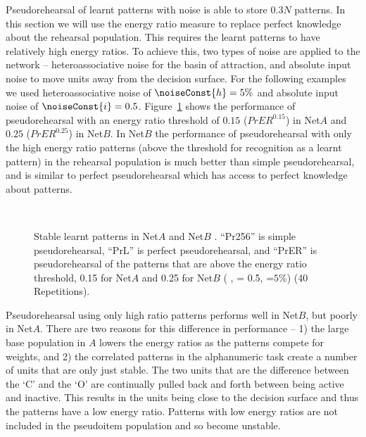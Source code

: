 Pseudorehearsal of learnt patterns with noise is able to store $0.3N$ patterns.  In this section we will use the energy ratio measure to replace perfect knowledge about the rehearsal population.  This requires the learnt patterns to have relatively high energy ratios. To achieve this, two types of noise are applied to the network --  heteroassociative noise for the basin of attraction, and absolute input noise to move units away from the decision surface.  For the following examples we used heteroassociative noise of $\noiseConst{h}=5\%$ and absolute input noise of $\noiseConst{i}=0.5$. Figure~\ref{fig:PrER0.25noise} shows the performance of pseudorehearsal with an energy ratio threshold of $0.15$ ($PrER^{0.15}$) in Net$A$ and $0.25$ ($PrER^{0.25}$) in Net$B$.  In Net$B$ the performance of pseudorehearsal with only the high energy ratio patterns (above the threshold for recognition as a learnt pattern) in the rehearsal population is much better than simple pseudorehearsal, and is similar to perfect pseudorehearsal which has access to perfect knowledge about patterns.

\begin{figure}[p]
\center
\small
	
	\vspace{1cm}\\
	
	\caption{Stable learnt patterns in Net$A$  and Net$B$ . ``Pr256'' is simple pseudorehearsal, ``PrL\noiseConst{}'' is perfect pseudorehearsal, and ``PrER\noiseConst{}'' is pseudorehearsal of the patterns that are above the energy ratio threshold, 0.15 for Net$A$ and 0.25 for Net$B$ ( , = 0.5, =$5\%$) (40 Repetitions).}
	\label{fig:PrER0.25noise}
\end{figure}

Pseudorehearsal using only high ratio patterns performs well in Net$B$, but poorly in Net$A$.  There are two reasons for this difference in performance -- 1) the large base population in $A$ lowers the energy ratios as the patterns compete for weights, and 2) the correlated patterns in the alphanumeric task create a number of units that are only just stable.  The two units that are the difference between the `C' and the `O' are continually pulled back and forth between being active and inactive.  This results in the units being close to the decision surface and thus the patterns have a low energy ratio.  Patterns with low energy ratios are not included in the pseudoitem population and so become unstable.

